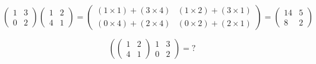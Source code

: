 \documentclass{article}
\begin{document}
\bigskip
\large{
\[ \left(
\begin{array}{cc}
1 & 3 \\ 
0 & 2
\end{array} \right)\left(
\begin{array}{cc}
1 & 2 \\ 
4 & 1
\end{array} \right) = \left(
\begin{array}{cc}
(1 \times 1) + (3 \times 4) & (1 \times 2) + (3 \times 1) \\ 
(0 \times 4) + (2 \times 4) & (0 \times 2) + (2 \times 1)
\end{array} \right) = \left(
\begin{array}{cc}
14 & 5 \\ 
8 & 2
\end{array} \right) \]
}

\[ \left(
\left(
\begin{array}{cc}
1 & 2 \\ 
4 & 1
\end{array} \right)
\begin{array}{cc}
1 & 3 \\ 
0 & 2
\end{array} \right) = ? \]
\end{document}
